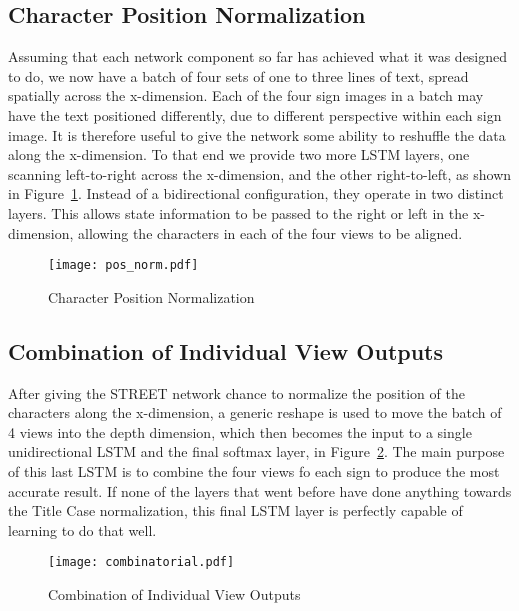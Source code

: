 \documentclass[runningheads]{llncs}
\begin{document}
\subsection{Character Position Normalization}

Assuming that each network component so far has achieved what it was designed to do, we now have
a batch of four sets of
 one to three lines of text, spread spatially across the x-dimension. Each of the four sign images
 in a batch may have the text positioned differently, due to different perspective within each sign image.
 It is therefore useful to give the network some ability to reshuffle the data along the x-dimension.
 To that end we provide two more LSTM layers, one scanning left-to-right across the x-dimension,
 and the other right-to-left, as shown in Figure~\ref{fig:pos_norm}.
 Instead of a bidirectional configuration, they operate in two distinct layers.
This allows state information to be passed to the right or left in the x-dimension, allowing the characters
in each of the four views to be aligned.

\begin{figure}
\centering
\vspace{-6.5cm}
\texttt{[image: pos\_norm.pdf]}
\caption{Character Position Normalization}
\label{fig:pos_norm}
\end{figure}

\subsection{Combination of Individual View Outputs}
After giving the STREET network chance to normalize the position of the characters along the x-dimension,
 a generic reshape is used to move the batch of 4 views into the depth dimension, which then becomes
 the input to a single unidirectional LSTM and the final softmax layer,
 in Figure~\ref{fig:combinatorial}.
 The main purpose of this last LSTM is to combine the four views fo each sign to produce the most accurate
result. If none of the layers that went before have done anything towards the Title Case normalization,
 this final LSTM layer is perfectly capable of learning to do that well.

\begin{figure}
\centering
\vspace{-4.5cm}
\texttt{[image: combinatorial.pdf]}
\caption{Combination of Individual View Outputs}
\label{fig:combinatorial}
\end{figure}
\end{document}
